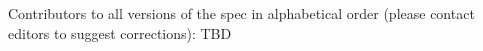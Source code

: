 
%
%

\noindent
Contributors to all versions of the spec in
alphabetical order (please contact editors to suggest
corrections):
TBD
